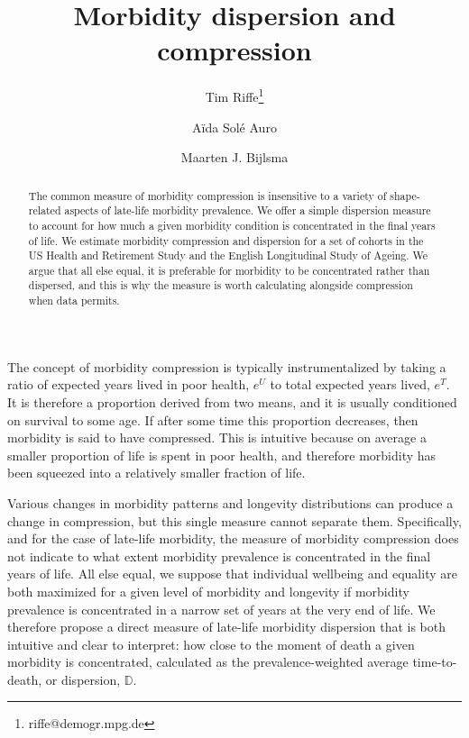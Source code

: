 \documentclass{article}
\begin{document}
\title{Morbidity dispersion and compression}

\author[1]{Tim Riffe\thanks{riffe@demogr.mpg.de}}
\author[2]{A{\"i}da Sol\'{e} Auro}
\author[1]{Maarten J. Bijlsma}

\maketitle

\begin{abstract}
The common measure of morbidity compression is insensitive to a variety of
shape-related aspects of late-life morbidity prevalence. We offer a simple
dispersion measure to account for how much a given morbidity condition is
concentrated in the final years of life. We estimate morbidity compression and
dispersion for a set of cohorts in the US Health and Retirement Study and the
English Longitudinal Study of Ageing. We argue that all else equal, it is 
preferable for morbidity to be concentrated rather than dispersed, and this 
is why the measure is worth calculating alongside compression when data permits.
\end{abstract}

The concept of morbidity compression is typically instrumentalized by taking a
ratio of expected years lived in poor health, $e^U$ to total expected years
lived, $e^T$.
It is therefore a proportion derived from two means, and it is usually conditioned on survival to some age. If after some time this proportion
decreases, then morbidity is said to have compressed. This is intuitive because on average a smaller proportion of life is spent in
poor health, and therefore morbidity has been squeezed into a relatively smaller
fraction of life. 

Various changes in morbidity patterns and longevity
distributions can produce a change in compression, but this single
measure cannot separate them. Specifically, and for the case of late-life morbidity, the measure of
morbidity compression does not indicate to what extent morbidity prevalence is
concentrated in the final years of life. All else equal, we suppose that
individual wellbeing and equality are both maximized for a given level of
morbidity and longevity if morbidity prevalence is concentrated in a narrow set of years at the very end of
life.
We therefore propose a direct measure of late-life morbidity dispersion that
is both intuitive and clear to interpret: how close to the moment of death a given morbidity is
concentrated, calculated as the prevalence-weighted average
time-to-death, or dispersion, $\mathbb{D}$.
\end{document}

